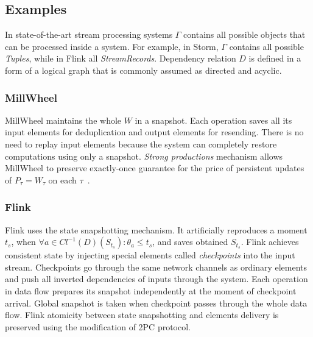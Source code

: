 
\subsection{Examples}

In state-of-the-art stream processing systems $\Gamma$ contains all possible objects that can be processed inside a system. For example, in Storm, $\Gamma$ contains all possible {\em Tuples}, while in Flink all {\em StreamRecords}. Dependency relation $D$ is defined in a form of a logical graph that is commonly assumed as directed and acyclic.

\subsubsection{MillWheel}

MillWheel maintains the whole $W$ in a snapshot. Each operation saves all its input elements for deduplication and output elements for resending. There is no need to replay input elements because the system can completely restore computations using only a snapshot. {\em Strong productions} mechanism allows MillWheel to preserve exactly-once guarantee for the price of persistent updates of $P_\tau=W_\tau$ on each $\tau$~\cite{Akidau:2013:MFS:2536222.2536229}.    

\subsubsection{Flink}

Flink uses the state snapshotting mechanism. It artificially reproduces a moment $t_s$, when $\forall{a}\in{Cl^{-1}(D)(S_{t_s})}:\theta_a \leq t_s$, and saves obtained $S_{t_s}$. Flink achieves consistent state by injecting special elements called {\em checkpoints} into the input stream. Checkpoints go through the same network channels as ordinary elements and push all inverted dependencies of inputs through the system. Each operation in data flow prepares its snapshot independently at the moment of checkpoint arrival. Global snapshot is taken when checkpoint passes through the whole data flow. Flink atomicity between state snapshotting and elements delivery is preserved using the modification of 2PC protocol.

